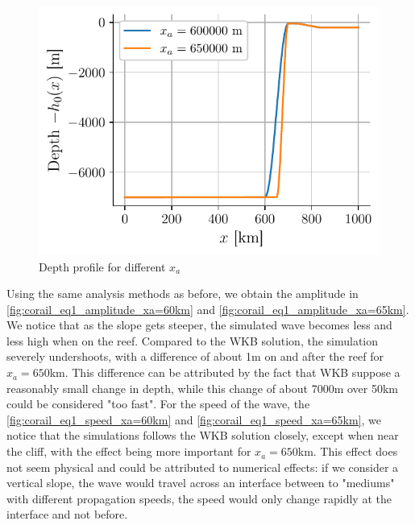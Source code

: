 \begin{figure}[h]
    \centering
    \includegraphics[width=0.6\linewidth]{figures/corail_eq1_depth_var_xa.pdf}
    \caption{Depth profile for different \(x_a\)}
    \label{fig:corail_eq1_depth_xa}
\end{figure}

Using the same analysis methods as before, we obtain the amplitude in \autoref{fig:corail_eq1_amplitude_xa=60km} and \autoref{fig:corail_eq1_amplitude_xa=65km}. We notice that as the slope gets steeper, the simulated wave becomes less and less high when on the reef. Compared to the WKB solution, the simulation severely undershoots, with a difference of about 1m on and after the reef for \(x_a = 650\)km. This difference can be attributed by the fact that WKB suppose a reasonably small change in depth, while this change of about 7000m over 50km could be considered "too fast". For the speed of the wave, the \autoref{fig:corail_eq1_speed_xa=60km} and \autoref{fig:corail_eq1_speed_xa=65km}, we notice that the simulations follows the WKB solution closely, except when near the cliff, with the effect being more important for \(x_a = 650\)km. This effect does not seem physical and could be attributed to numerical effects: if we consider a vertical slope, the wave would travel across an interface between to "mediums" with different propagation speeds, the speed would only change rapidly at the interface and not before.

